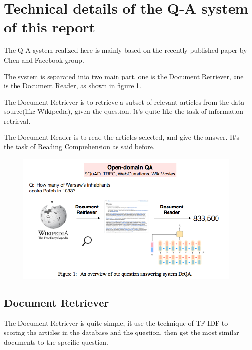 \documentclass[12pt]{article}
\numberwithin{equation}{section}
\begin{document}
\section{Technical details of the Q-A system of this report}
	The Q-A system realized here is mainly based on the recently published paper by Chen and Facebook group\citep{chen2017reading}. \par
	The system is separated into two main part, one is the Document Retriever, one is the Document Reader, as shown in figure 1. \par
	The Document Retriever is to retrieve a subset of relevant articles from the data source(like Wikipedia), given the question. It's quite like the task of information retrieval.\par
	The Document Reader is to read the articles selected, and give the answer. It's the task of Reading Comprehension as said before. \par
	\begin{figure}[H]
		\includegraphics[width=\linewidth]{fig_QA/structure.png}
		\label{fig:structure}
	\end{figure}
\subsection{Document Retriever}
	The Document Retriever is quite simple, it use the technique of TF-IDF\citep{salton1988term} to scoring the articles in the database and the question, then get the most similar documents to the specific question.  \par
\end{document}
